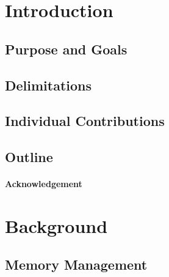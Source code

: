 \documentclass[a4paper,12pt]{article}
\begin{document}

\cleardoublepage

\mainmatter


\section{Introduction}
\label{sec:introduction}


\newpage

\subsection{Purpose and Goals}
\label{sec:purpose}


\subsection{Delimitations}
\label{sec:delimitations}


\subsection{Individual Contributions}
\label{sec:individual_contrubitons}


\subsection{Outline}
\label{sec:outline}


\paragraph{Acknowledgement}


\newpage
\section{Background}
\label{sec:background}


\subsection{Memory Management}
\label{sec:memory_management}

\end{document}
